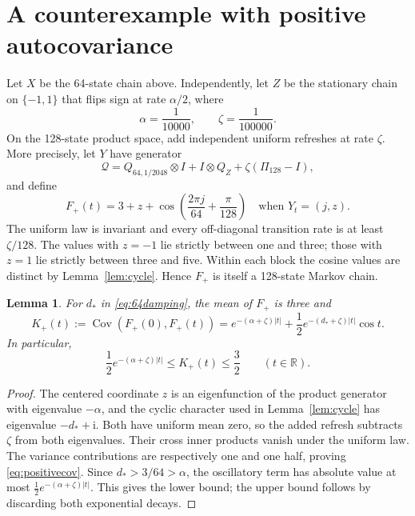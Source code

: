 \documentclass[aap,preprint]{imsart}
\numberwithin{equation}{section}
\theoremstyle{plain}
\newtheorem{lemma}[theorem]{Lemma}
\theoremstyle{definition}
\newcommand{\R}{\mathbb R}
\newcommand{\1}{\mathbf 1}
\newcommand{\ii}{\mathrm i}
\DeclareMathOperator{\Cov}{Cov}
\begin{document}
\section{A counterexample with positive autocovariance}\label{sec:positive}
Let $X$ be the 64-state chain above. Independently, let $Z$ be the stationary chain on $\{-1,1\}$ that flips sign at rate $\alpha/2$, where
\begin{equation}\label{eq:positiverates}
 \alpha=\frac1{10000},\qquad \zeta=\frac1{100000}.
\end{equation}
On the 128-state product space, add independent uniform refreshes at rate $\zeta$. More precisely, let $Y$ have generator
\begin{equation}\label{eq:positivegenerator}
 \mathcal Q=Q_{64,1/2048}\otimes I+I\otimes Q_Z
                  +\zeta(\Pi_{128}-I),
\end{equation}
and define
\begin{equation}\label{eq:positiveF}
 F_+(t)=3+z+\cos\left(\frac{2\pi j}{64}+\frac\pi{128}\right)
 \quad\text{when }Y_t=(j,z).
\end{equation}
The uniform law is invariant and every off-diagonal transition rate is at least $\zeta/128$. The values with $z=-1$ lie strictly between one and three; those with $z=1$ lie strictly between three and five. Within each block the cosine values are distinct by Lemma~\ref{lem:cycle}. Hence $F_+$ is itself a 128-state Markov chain.

\begin{lemma}\label{lem:positivecov}
For $d_*$ in \eqref{eq:64damping}, the mean of $F_+$ is three and
\begin{equation}\label{eq:positivecov}
 K_+(t):=\Cov(F_+(0),F_+(t))
 =e^{-(\alpha+\zeta)|t|}
       +\frac12e^{-(d_*+\zeta)|t|}\cos t.
\end{equation}
In particular,
\begin{equation}\label{eq:positivecovbound}
 \frac12e^{-(\alpha+\zeta)|t|}\le K_+(t)\le\frac32
 \qquad(t\in\R).
\end{equation}
\end{lemma}
\begin{proof}
The centered coordinate $z$ is an eigenfunction of the product generator with eigenvalue $-\alpha$, and the cyclic character used in Lemma~\ref{lem:cycle} has eigenvalue $-d_*+\ii$. Both have uniform mean zero, so the added refresh subtracts $\zeta$ from both eigenvalues. Their cross inner products vanish under the uniform law. The variance contributions are respectively one and one half, proving \eqref{eq:positivecov}. Since $d_*>3/64>\alpha$, the oscillatory term has absolute value at most $\tfrac12e^{-(\alpha+\zeta)|t|}$. This gives the lower bound; the upper bound follows by discarding both exponential decays.
\end{proof}
\end{document}
